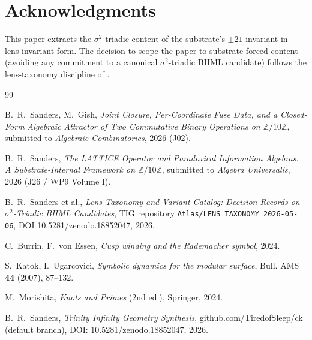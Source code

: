 \documentclass[11pt,reqno]{amsart}
\theoremstyle{plain}
\theoremstyle{definition}
\theoremstyle{remark}
\newcommand{\Z}{\mathbb{Z}}
\newcommand{\sig}{\sigma}
\begin{document}
\section*{Acknowledgments}

This paper extracts the $\sig^{2}$-triadic content of the substrate's
$\pm 21$ invariant in lens-invariant form. The decision to scope the
paper to substrate-forced content (avoiding any commitment to a
canonical $\sig^{2}$-triadic BHML candidate) follows the lens-taxonomy
discipline of \cite{Atlas2026Tiering}.

\begin{thebibliography}{99}

 B.~R.~Sanders, M.~Gish,
\emph{Joint Closure, Per-Coordinate Fuse Data, and a Closed-Form
Algebraic Attractor of Two Commutative Binary Operations on
$\Z/10\Z$}, submitted to \emph{Algebraic Combinatorics}, 2026 (J02).

 B.~R.~Sanders,
\emph{The LATTICE Operator and Paradoxical Information Algebras: A
Substrate-Internal Framework on $\Z/10\Z$}, submitted to
\emph{Algebra Universalis}, 2026 (J26 / WP9 Volume I).

 B.~R.~Sanders et al.,
\emph{Lens Taxonomy and Variant Catalog: Decision Records on
$\sig^{2}$-Triadic BHML Candidates},
TIG repository \texttt{Atlas/LENS\_TAXONOMY\_2026-05-06},
DOI 10.5281/zenodo.18852047, 2026.

 C.~Burrin, F.~von Essen,
\emph{Cusp winding and the Rademacher symbol}, 2024.

 S.~Katok, I.~Ugarcovici,
\emph{Symbolic dynamics for the modular surface},
Bull. AMS \textbf{44} (2007), 87--132.

 M.~Morishita,
\emph{Knots and Primes} (2nd ed.), Springer, 2024.

 B.~R.~Sanders,
\emph{Trinity Infinity Geometry Synthesis},
github.com/TiredofSleep/ck (default branch),
DOI: 10.5281/zenodo.18852047, 2026.

\end{thebibliography}
\end{document}
